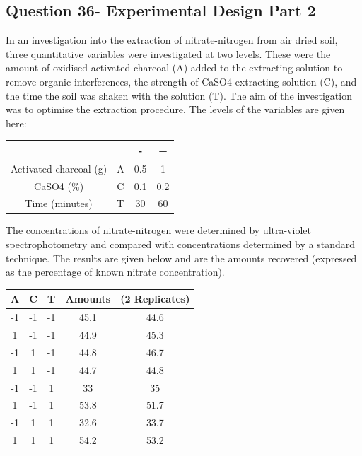 \documentclass[a4paper,12pt]{article}
\begin{document}
\subsection*{Question 36-  Experimental Design Part 2 }

In an investigation into the extraction of nitrate-nitrogen from air dried soil, three quantitative variables were investigated at two levels. These were the amount of oxidised activated charcoal (A) added to the extracting solution to remove organic interferences, the strength of CaSO4 extracting solution (C), and the time the soil was shaken with the solution (T). The aim of the investigation was to optimise the extraction procedure. The levels of the variables are given here:
\begin{center}
	{
		\large
		\begin{tabular}{|cc|c|c|}
			\hline	&		&\phantom{sp}	{\LARGE -}\phantom{sp}	&	\phantom{sp} {\LARGE +} \phantom{sp}	\\ \hline
			Activated charcoal (g) 	&	A 	&	0.5	&	1	\\ \hline
			CaSO{4} (\%) 	&	C 	&	0.1	&	0.2	\\ \hline
			Time (minutes) 	&	T 	&	30	&	60	\\ \hline
		\end{tabular} 
	}
\end{center}

The concentrations of nitrate-nitrogen were determined by ultra-violet spectrophotometry and compared with concentrations determined by a standard technique. The results are given below and are the amounts recovered (expressed as the percentage of known nitrate concentration).
{
	\large
	\begin{center}
		\begin{tabular}{|c|c|c|cc|}
			\hline
			\phantom{sp}A\phantom{sp}	&	\phantom{sp}C\phantom{sp}	&\phantom{sp}	T\phantom{sp}	&	Amounts&	(2 Replicates)	\\
			\hline
			-1	&	-1	&	-1	&	45.1	&	44.6	\\ \hline
			
			1	&	-1	&	-1	&	44.9	&	45.3	\\ \hline
			
			-1	&	1	&	-1	&	44.8	&	46.7	\\ \hline
			
			1	&	1	&	-1	&	44.7	&	44.8	\\ \hline
			
			-1	&	-1	&	1	&	33	&	35	\\ \hline
			
			1	&	-1	&	1	&	53.8	&	51.7	\\ \hline
			
			-1	&	1	&	1	&	32.6	&	33.7	\\ \hline							
			1	&	1	&	1	&	54.2	&	53.2	\\ \hline
		\end{tabular}
	\end{center}
}
\end{document}
